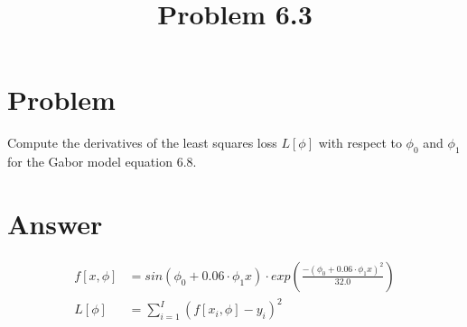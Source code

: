 \documentclass{article}
\title{Problem 6.3}
\begin{document}
\section{Problem}

Compute the derivatives of the least squares loss $ L [ \phi ] $  with respect to $ \phi_0 $ and $\phi_1$ for the Gabor model equation 6.8. 

\section{Answer}

\begin{align}
    f[x,\phi] &= sin(\phi_0 + 0.06 \cdot \phi_1x) \cdot exp  \left( \frac{-(\phi_0 + 0.06 \cdot \phi_1x)^2}{32.0} \right)
    \\
    L[\phi]   &= \sum_{i=1}^{I} (f[x_i, \phi]-y_i)^2
    \\
\end{align}
\end{document}
